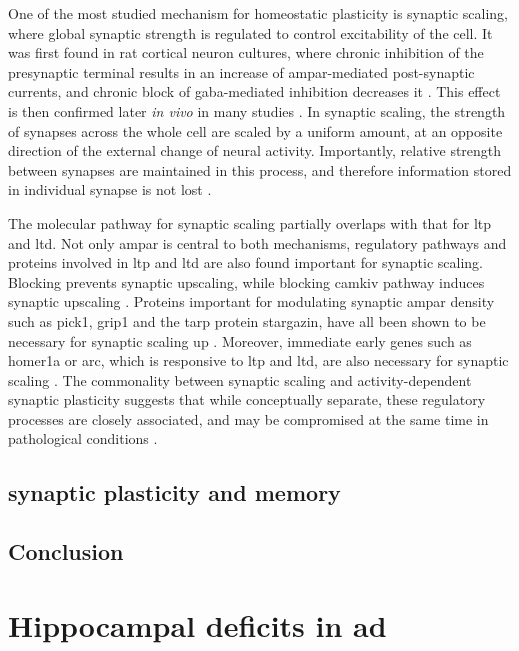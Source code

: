 One of the most studied mechanism for homeostatic plasticity is synaptic scaling, where global synaptic strength is regulated to control excitability of the cell. It was first found in rat cortical neuron cultures, where chronic inhibition of the presynaptic terminal results in an increase of \gls{ampar}-mediated post-synaptic currents, and chronic block of \gls{gaba}-mediated inhibition decreases it \citep{turrigiano98}. This effect is then confirmed later \textit{in vivo} in many studies \citep{whitt14}. In synaptic scaling, the strength of synapses across the whole cell are scaled by a uniform amount, at an opposite direction of the external change of neural activity. Importantly, relative strength between synapses are maintained in this process, and therefore information stored in individual synapse is not lost \citep{turrigiano08}. 

The molecular pathway for synaptic scaling partially overlaps with that for \gls{ltp} and \gls{ltd}. Not only \gls{ampar} is central to both mechanisms, regulatory pathways and proteins involved in \gls{ltp} and \gls{ltd} are also found important for synaptic scaling. Blocking  prevents synaptic upscaling, while blocking \gls{camkiv} pathway induces synaptic upscaling \citep{ibata08}. Proteins important for modulating synaptic \gls{ampar} density such as \gls{pick1}, \gls{grip1} and the \gls{tarp} protein stargazin, have all been shown to be necessary for synaptic scaling up \citep{anggono11, gainey15, louros14}. Moreover, immediate early genes such as homer1a or \gls{arc}, which is responsive to \gls{ltp} and \gls{ltd}, are also necessary for synaptic scaling \citep{hu10, gao10}. The commonality between synaptic scaling and activity-dependent synaptic plasticity suggests that while conceptually separate, these regulatory processes are closely associated, and may be compromised at the same time in pathological conditions \citep{fernandes16}.

\subsection{synaptic plasticity and memory}
\citep{migues16}
\subsection{Conclusion}


\section{Hippocampal deficits in \gls{ad}}
